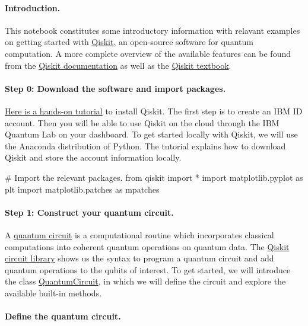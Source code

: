 \documentclass[%
oneside,                 %
final,                   %
10pt]{article}
\begin{document}
\paragraph{Introduction.}
This notebook constitutes some introductory information with relavant
examples on getting started with \href{{https://qiskit.org/}}{Qiskit}, an
open-source software for quantum computation. A more complete overview
of the available features can be found from the \href{{https://qiskit.org/documentation/tutorials.html}}{Qiskit documentation} as
well as the \href{{https://qiskit.org/textbook/preface.html}}{Qiskit textbook}.

\paragraph{Step 0: Download the software and import packages.}
\href{{https://www.youtube.com/watch?v=1kRfHNUbkrg&t=163s}}{Here is a hands-on tutorial} to install Qiskit.
The first step is to create an IBM ID account. Then you will be able
to use Qiskit on the cloud through the IBM Quantum Lab on your
dashboard. To get started locally with Qiskit, we will use the
Anaconda distribution of Python. The tutorial explains how to download
Qiskit and store the account information locally.







\bpycod
# Import the relevant packages.
from qiskit import * 
import matplotlib.pyplot as plt
import matplotlib.patches as mpatches

\epycod


\paragraph{Step 1: Construct your quantum circuit.}
A \href{{https://wiki2.org/en/Quantum_circuit}}{quantum circuit} is a
computational routine which incorporates classical computations into
coherent quantum operations on quantum data. The \href{{https://qiskit.org/documentation/apidoc/circuit_library.html}}{Qiskit circuit library}
shows us the syntax to program a quantum circuit and add quantum
operations to the qubits of interest. To get started, we will
introduce the class
\href{{https://qiskit.org/documentation/stubs/qiskit.circuit.QuantumCircuit.html}}{QuantumCircuit},
in which we will define the circuit and explore the available built-in
methods.

\paragraph{Define the quantum circuit.}
\end{document}

